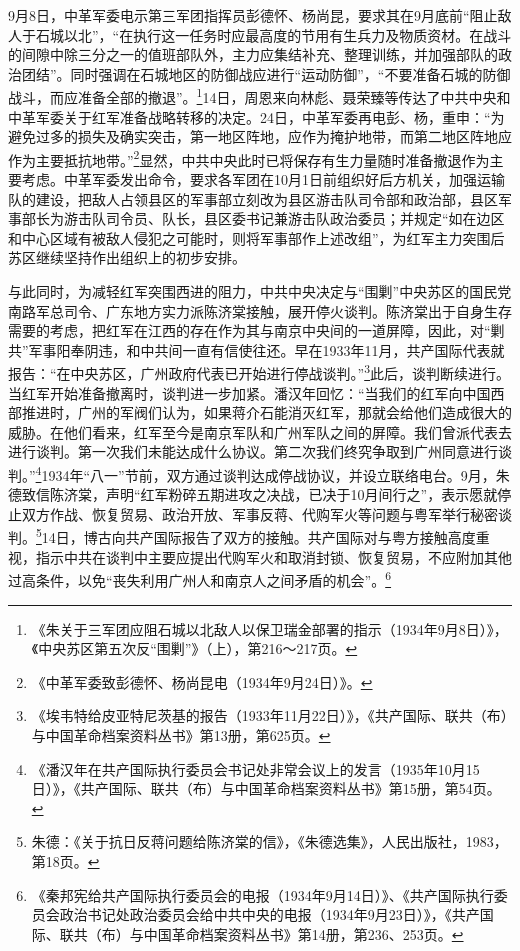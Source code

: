 9月8日，中革军委电示第三军团指挥员彭德怀、杨尚昆，要求其在9月底前“阻止敌人于石城以北”，“在执行这一任务时应最高度的节用有生兵力及物质资材。在战斗的间隙中除三分之一的值班部队外，主力应集结补充、整理训练，并加强部队的政治团结”。同时强调在石城地区的防御战应进行“运动防御”，“不要准备石城的防御战斗，而应准备全部的撤退”。\footnote{《朱关于三军团应阻石城以北敌人以保卫瑞金部署的指示（1934年9月8日）》，《中央苏区第五次反“围剿”》（上），第216～217页。}14日，周恩来向林彪、聂荣臻等传达了中共中央和中革军委关于红军准备战略转移的决定。24日，中革军委再电彭、杨，重申：“为避免过多的损失及确实突击，第一地区阵地，应作为掩护地带，而第二地区阵地应作为主要抵抗地带。”\footnote{《中革军委致彭德怀、杨尚昆电（1934年9月24日）》。}显然，中共中央此时已将保存有生力量随时准备撤退作为主要考虑。中革军委发出命令，要求各军团在10月1日前组织好后方机关，加强运输队的建设，把敌人占领县区的军事部立刻改为县区游击队司令部和政治部，县区军事部长为游击队司令员、队长，县区委书记兼游击队政治委员；并规定“如在边区和中心区域有被敌人侵犯之可能时，则将军事部作上述改组”，为红军主力突围后苏区继续坚持作出组织上的初步安排。


与此同时，为减轻红军突围西进的阻力，中共中央决定与“围剿”中央苏区的国民党南路军总司令、广东地方实力派陈济棠接触，展开停火谈判。陈济棠出于自身生存需要的考虑，把红军在江西的存在作为其与南京中央间的一道屏障，因此，对“剿共”军事阳奉阴违，和中共间一直有信使往还。早在1933年11月，共产国际代表就报告：“在中央苏区，广州政府代表已开始进行停战谈判。”\footnote{《埃韦特给皮亚特尼茨基的报告（1933年11月22日）》，《共产国际、联共（布）与中国革命档案资料丛书》第13册，第625页。}此后，谈判断续进行。当红军开始准备撤离时，谈判进一步加紧。潘汉年回忆：“当我们的红军向中国西部推进时，广州的军阀们认为，如果蒋介石能消灭红军，那就会给他们造成很大的威胁。在他们看来，红军至今是南京军队和广州军队之间的屏障。我们曾派代表去进行谈判。第一次我们未能达成什么协议。第二次我们终究争取到广州同意进行谈判。”\footnote{《潘汉年在共产国际执行委员会书记处非常会议上的发言（1935年10月15日）》，《共产国际、联共（布）与中国革命档案资料丛书》第15册，第54页。}1934年“八一”节前，双方通过谈判达成停战协议，并设立联络电台。9月，朱德致信陈济棠，声明“红军粉碎五期进攻之决战，已决于10月间行之”，表示愿就停止双方作战、恢复贸易、政治开放、军事反蒋、代购军火等问题与粤军举行秘密谈判。\footnote{朱德：《关于抗日反蒋问题给陈济棠的信》，《朱德选集》，人民出版社，1983，第18页。}14日，博古向共产国际报告了双方的接触。共产国际对与粤方接触高度重视，指示中共在谈判中主要应提出代购军火和取消封锁、恢复贸易，不应附加其他过高条件，以免“丧失利用广州人和南京人之间矛盾的机会”。\footnote{《秦邦宪给共产国际执行委员会的电报（1934年9月14日）》、《共产国际执行委员会政治书记处政治委员会给中共中央的电报（1934年9月23日）》，《共产国际、联共（布）与中国革命档案资料丛书》第14册，第236、253页。}


